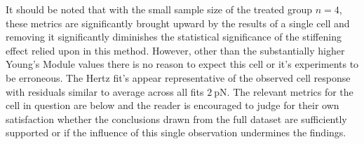 \documentclass[
  paper=a4,
  ,captions=tableheading
]{scrartcl}
\makeatletter
\newcommand*\pandocbounded[1]{%
  \sbox\pandoc@box{#1}%
  \Gscale@div\@tempa{\textheight}{\dimexpr\ht\pandoc@box+\dp\pandoc@box\relax}%
  \Gscale@div\@tempb{\linewidth}{\wd\pandoc@box}%
  \ifdim\@tempb\p@<\@tempa\p@\let\@tempa\@tempb\fi%
  \ifdim\@tempa\p@<\p@\scalebox{\@tempa}{\usebox\pandoc@box}%
  \else\usebox{\pandoc@box}%
  \fi%
}
\makeatother
\begin{document}
It should be noted that with the small sample size of the treated group
\(n=4\), these metrics are significantly brought upward by the results
of a single cell and removing it significantly diminishes the
statistical significance of the stiffening effect relied upon in this
method. However, other than the substantially higher Young's Module
values there is no reason to expect this cell or it's experiments to be
erroneous. The Hertz fit's appear representative of the observed cell
response with residuals similar to average across all fits
\(2 \ \text{pN}\). The relevant metrics for the cell in question are
below and the reader is encouraged to judge for their own satisfaction
whether the conclusions drawn from the full dataset are sufficiently
supported or if the influence of this single observation undermines the
findings.

\noindent
\begin{minipage}[t]{0.48\textwidth}

\pandocbounded{}

\begin{figure}
\centering
\caption{}
\end{figure}


\pandocbounded{}

\begin{figure}
\centering
\caption{}
\end{figure}


\pandocbounded{}

\begin{figure}
\centering
\caption{}
\end{figure}
\end{minipage}
\hfill
\begin{minipage}[t]{0.48\textwidth}

\pandocbounded{}

\begin{figure}
\centering
\caption{}
\end{figure}


\pandocbounded{}

\begin{figure}
\centering
\caption{}
\end{figure}


\pandocbounded{}

\begin{figure}
\centering
\caption{}
\end{figure}
\end{minipage}
\end{document}
